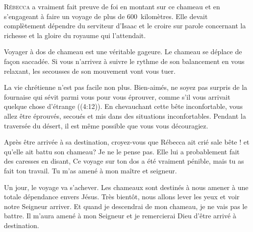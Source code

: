 \dvrule







\lettrine{R}{ébecca} a vraiment fait preuve de foi
 en montant sur ce chameau et en s'engageant à faire un voyage
 de plus de 600~kilomètres.
 Elle devait complètement dépendre du serviteur d'Isaac
 et le croire sur parole concernant la richesse
 et la gloire du royaume qui l'attendait. 

Voyager à dos de chameau est une véritable gageure.
 Le chameau se déplace de fa\c{c}on saccadée.
 Si vous n'arrivez à suivre le rythme de son balancement
 en vous relaxant, les secousses de son mouvement vont vous tuer.

La vie chrétienne n'est pas facile non plus.
 \Og Bien-aimés, ne soyez pas surpris de la fournaise qui sévit
 parmi vous pour vous éprouver, comme s'il vous arrivait
 quelque chose d'étrange \Fg{} ((4:12)).
 En chevauchant cette bête inconfortable, vous allez être éprouvés,
 secoués et mis dans des situations inconfortables.
 Pendant la traversée du désert,
 il est même possible que vous vous découragiez. 

Après être arrivée à sa destination,
 croyez-vous que Rébecca ait crié \Og sale bête ! \Fg{}
 et qu'elle ait battu son chameau? Je ne le pense pas.
 Elle lui a probablement fait des caresses en disant,
 \Og Ce voyage sur ton dos a été vraiment pénible,
 mais tu as fait ton travail. Tu m'as amené à mon maître et seigneur. \Fg{}


Un jour, le voyage va s'achever. Les chameaux sont destinés à nous amener
 à une totale dépendance envers Jésus.
 Très bientôt, nous allons lever les yeux et voir notre Seigneur arriver.
 Et quand je descendrai de mon chameau, je ne vais pas le battre.
 Il m'aura amené à mon Seigneur et je remercierai Dieu
 d'être arrivé à destination. 

